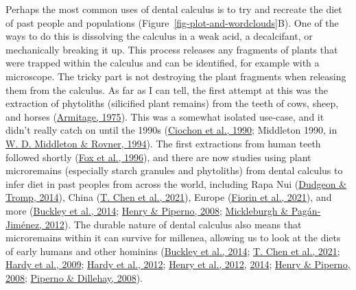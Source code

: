 \documentclass[
  letterpaper,
]{book}
\begin{document}
Perhaps the most common uses of dental calculus is to try and recreate
the diet of past people and populations
(Figure~\ref{fig-plot-and-wordclouds}B). One of the ways to do this is
dissolving the calculus in a weak acid, a decalcifant, or mechanically
breaking it up. This process releases any fragments of plants that were
trapped within the calculus and can be identified, for example with a
microscope. The tricky part is not destroying the plant fragments when
releasing them from the calculus. As far as I can tell, the first
attempt at this was the extraction of phytoliths (silicified plant
remains) from the teeth of cows, sheep, and horses
(\protect\hyperlink{ref-armitageExtractionIdentification1975}{Armitage,
1975}). This was a somewhat isolated use-case, and it didn't really
catch on until the 1990s
(\protect\hyperlink{ref-ciochonOpalPhytoliths1990}{Ciochon et al.,
1990}; Middleton 1990, in
\protect\hyperlink{ref-middletonOpalPhytoliths1994}{W. D. Middleton \&
Rovner, 1994}). The first extractions from human teeth followed shortly
(\protect\hyperlink{ref-foxPhytolithCalculus1996}{Fox et al., 1996}),
and there are now studies using plant microremains (especially starch
granules and phytoliths) from dental calculus to infer diet in past
peoples from across the world, including Rapa Nui
(\protect\hyperlink{ref-dudgeonDietGeography2014}{Dudgeon \& Tromp,
2014}), China (\protect\hyperlink{ref-chenStarchGrains2021}{T. Chen et
al., 2021}), Europe
(\protect\hyperlink{ref-fiorinCombiningDental2021}{Fiorin et al.,
2021}), and more
(\protect\hyperlink{ref-buckleyDentalCalculus2014}{Buckley et al.,
2014}; \protect\hyperlink{ref-henryCalculusSyria2008}{Henry \& Piperno,
2008}; \protect\hyperlink{ref-mickleburghNewInsights2012}{Mickleburgh \&
Pagán-Jiménez, 2012}). The durable nature of dental calculus also means
that microremains within it can survive for millenea, allowing us to
look at the diets of early humans and other hominins
(\protect\hyperlink{ref-buckleyDentalCalculus2014}{Buckley et al.,
2014}; \protect\hyperlink{ref-chenStarchGrains2021}{T. Chen et al.,
2021}; \protect\hyperlink{ref-hardyStarchGranules2009}{Hardy et al.,
2009}; \protect\hyperlink{ref-hardyNeanderthalMedics2012}{Hardy et al.,
2012}; \protect\hyperlink{ref-henryDietAustralopithecus2012}{Henry et
al., 2012}, \protect\hyperlink{ref-henryNeanderthalCalculus2014}{2014};
\protect\hyperlink{ref-henryCalculusSyria2008}{Henry \& Piperno, 2008};
\protect\hyperlink{ref-pipernoStarchGrains2008}{Piperno \& Dillehay,
2008}).
\end{document}
